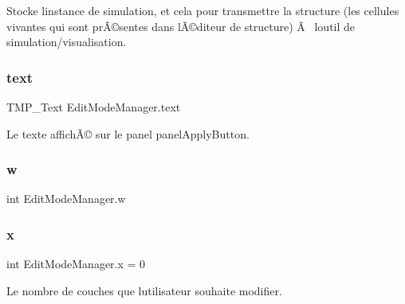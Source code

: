 Stocke l\textquotesingle{}instance de simulation, et cela pour transmettre la structure (les cellules vivantes qui sont prÃ©sentes dans l\textquotesingle{}Ã©diteur de structure) Ã  l\textquotesingle{}outil de simulation/visualisation. 

\mbox{\label{class_edit_mode_manager_ae6fc2f251b5813fc0c75330462b9dade}} 
\subsubsection{\texorpdfstring{text}{text}}
{\footnotesize\ttfamily T\+M\+P\+\_\+\+Text Edit\+Mode\+Manager.\+text\hspace{0.3cm}{\ttfamily [private]}}



Le texte affichÃ© sur le panel panel\+Apply\+Button. 

\mbox{\label{class_edit_mode_manager_ad9e4950cf24abf3ede8c0891c4df7b77}} 
\subsubsection{\texorpdfstring{w}{w}}
{\footnotesize\ttfamily int Edit\+Mode\+Manager.\+w\hspace{0.3cm}{\ttfamily [private]}}

\mbox{\label{class_edit_mode_manager_ab22d78b821b9c0e8a939ef89abe37f5f}} 
\subsubsection{\texorpdfstring{x}{x}}
{\footnotesize\ttfamily int Edit\+Mode\+Manager.\+x = 0\hspace{0.3cm}{\ttfamily [private]}}



Le nombre de couches que l\textquotesingle{}utilisateur souhaite modifier. 

